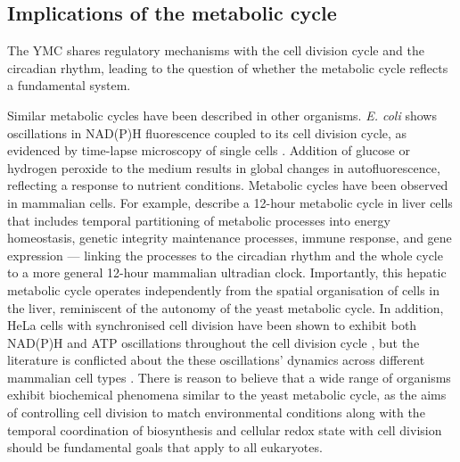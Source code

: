 \subsection{Implications of the metabolic cycle}
\label{subsec:intro-ymc-implications}


The YMC shares regulatory mechanisms with the cell division cycle and the circadian rhythm,
leading to the question of whether the metabolic cycle reflects a fundamental system.

Similar metabolic cycles have been described in other organisms.
\emph{E. coli} shows oscillations in NAD(P)H fluorescence coupled to its cell division cycle, as evidenced by time-lapse microscopy of single cells \citep{zhangDynamicSinglecellNAD2018}.
Addition of glucose or hydrogen peroxide to the medium results in global changes in autofluorescence, reflecting a response to nutrient conditions.
Metabolic cycles have been observed in mammalian cells.
For example, \citet{zhuLogicTemporalCompartmentalization2022} describe a 12-hour metabolic cycle in liver cells that includes temporal partitioning of metabolic processes into energy homeostasis, genetic integrity maintenance processes, immune response, and gene expression --- linking the processes to the circadian rhythm and the whole cycle to a more general 12-hour mammalian ultradian clock.
Importantly, this hepatic metabolic cycle operates independently from the spatial organisation of cells in the liver, reminiscent of the autonomy of the yeast metabolic cycle.
In addition, HeLa cells with synchronised cell division have been shown to exhibit both NAD(P)H and ATP oscillations throughout the cell division cycle \citep{ahnTemporalFluxomicsReveals2017}, but the literature is conflicted about the these oscillations' dynamics across different mammalian cell types \citep{zylstraMetabolicDynamicsCell2022}.
There is reason to believe that a wide range of organisms exhibit biochemical phenomena similar to the yeast metabolic cycle, as the aims of controlling cell division to match environmental conditions along with the temporal coordination of biosynthesis and cellular redox state with cell division should be fundamental goals that apply to all eukaryotes.

